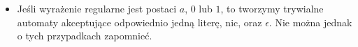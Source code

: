 \begin{itemize}
        \item Jeśli wyrażenie regularne jest postaci \( a \), \( 0 \) lub \( 1 \), to tworzymy trywialne automaty akceptujące odpowiednio jedną literę, nic, oraz \( \epsilon \). Nie można jednak o tych przypadkach zapomnieć.
    \end{itemize}
    